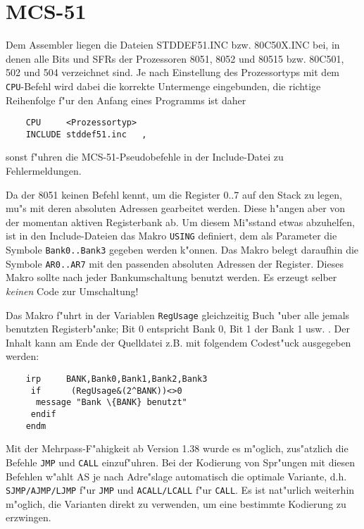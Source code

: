 \documentclass[12pt,a4paper,twoside]{report}
\newcommand{\ii}[1]{{\it #1}}
\newcommand{\tty}[1]{{\tt #1}}
\begin{document}

\section{MCS-51}

Dem Assembler liegen die Dateien STDDEF51.INC bzw. 80C50X.INC bei, in
denen alle Bits und SFRs der Prozessoren 8051, 8052 und 80515 bzw. 80C501,
502 und 504 verzeichnet sind.  Je nach Einstellung des Prozessortyps mit
dem \tty{CPU}-Befehl wird dabei die korrekte Untermenge eingebunden, die
richtige Reihenfolge f"ur den Anfang eines Programms ist daher
\begin{verbatim}
	CPU     <Prozessortyp>
	INCLUDE stddef51.inc   ,
\end{verbatim}
sonst f"uhren die MCS-51-Pseudobefehle in der Include-Datei zu
Fehlermeldungen.
\par
Da der 8051 keinen Befehl kennt, um die Register 0..7 auf den Stack zu
legen, mu"s mit deren absoluten Adressen gearbeitet werden.  Diese
h"angen aber von der momentan aktiven Registerbank ab.  Um diesem Mi"sstand
etwas abzuhelfen, ist in den Include-Dateien das Makro \tty{USING} definiert,
dem als Parameter die Symbole \tty{Bank0..Bank3} gegeben werden k"onnen.
Das Makro belegt daraufhin die Symbole \tty{AR0..AR7} mit den passenden
absoluten Adressen der Register.  Dieses Makro sollte nach jeder
Bankumschaltung benutzt werden.  Es erzeugt selber \ii{keinen} Code zur
Umschaltung!
\par
Das Makro f"uhrt in der Variablen \tty{RegUsage} gleichzeitig Buch "uber
alle jemals benutzten Registerb"anke; Bit 0 entspricht Bank 0, Bit 1 der
Bank 1 usw. .  Der Inhalt kann am Ende der Quelldatei z.B. mit folgendem
Codest"uck ausgegeben werden:
\begin{verbatim}
	irp     BANK,Bank0,Bank1,Bank2,Bank3
	 if      (RegUsage&(2^BANK))<>0
	  message "Bank \{BANK} benutzt"
	 endif
	endm
\end{verbatim}
Mit der Mehrpass-F"ahigkeit ab Version 1.38 wurde es m"oglich, zus"atzlich
die Befehle \tty{JMP} und \tty{CALL} einzuf"uhren.  Bei der Kodierung
von Spr"ungen mit diesen Befehlen w"ahlt AS je nach Adre"slage automatisch
die optimale Variante, d.h. \tty{SJMP/AJMP/LJMP} f"ur \tty{JMP} und
\tty{ACALL/LCALL} f"ur \tty{CALL}.  Es ist nat"urlich weiterhin m"oglich,
die Varianten direkt zu verwenden, um eine bestimmte Kodierung zu erzwingen.

\end{document}
